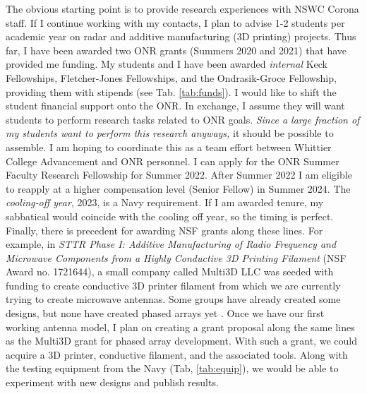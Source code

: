 \documentclass[../../../main.tex]{subfiles}
\begin{document}
The obvious starting point is to provide research experiences with NSWC Corona staff.  If I continue working with my contacts, I plan to advise 1-2 students per academic year on radar and additive manufacturing (3D printing) projects.  Thus far, I have been awarded two ONR grants (Summers 2020 and 2021) that have provided me funding.  My students and I have been awarded \textit{internal} Keck Fellowships, Fletcher-Jones Fellowships, and the Ondrasik-Groce Fellowship, providing them with stipends (see Tab. \ref{tab:funds}).  I would like to shift the student financial support onto the ONR.  In exchange, I assume they will want students to perform research tasks related to ONR goals.  \textit{Since a large fraction of my students want to perform this research anyways,} it should be possible to assemble.  I am hoping to coordinate this as a team effort between Whittier College Advancement and ONR personnel.  I can apply for the ONR Summer Faculty Research Fellowship for Summer 2022.  After Summer 2022 I am eligible to reapply at a higher compensation level (Senior Fellow) in Summer 2024.  The \textit{cooling-off year}, 2023, is a Navy requirement.  If I am awarded tenure, my sabbatical would coincide with the cooling off year, so the timing is perfect.
\\
\vspace{0.25cm}
Finally, there is precedent for awarding NSF grants along these lines.  For example, in \textit{STTR Phase I: Additive Manufacturing of Radio Frequency and Microwave Components from a Highly Conductive 3D Printing Filament} (NSF Award no. 1721644), a small company called Multi3D LLC was seeded with funding to create conductive 3D printer filament from which we are currently trying to create microwave antennas.  Some groups have already created some designs, but none have created phased arrays yet \cite{10.1016/j.addma.2017.10.002} \cite{10.1049/iet-map.2017.0104}.  Once we have our first working antenna model, I plan on creating a grant proposal along the same lines as the Multi3D grant for phased array development.  With such a grant, we could acquire a 3D printer, conductive filament, and the associated tools.  Along with the testing equipment from the Navy (Tab, \ref{tab:equip}), we would be able to experiment with new designs and publish results.
\end{document}
